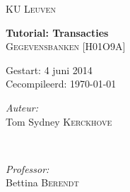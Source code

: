 \begin{titlepage}
\thispagestyle{empty}
\newcommand{\HRule}{\rule{\linewidth}{0.5mm}}
\center
\textsc{\LARGE KU Leuven}\\[1.5cm]
\vfill


{ \Huge \bfseries Tutorial: Transacties}\\[0.4cm]
\textsc{\large Gegevensbanken [H01O9A]}\\[0.5cm]

\vspace{5cm}

\begin{Large}
Gestart: 4 juni 2014\\
Cecompileerd: \today\\
\end{Large}
\vspace{5cm}

\begin{minipage}{0.4\textwidth}
\begin{flushleft} \large
\emph{Auteur:}\\
Tom Sydney \textsc{Kerckhove}
\end{flushleft}
\end{minipage}
~
\begin{minipage}{0.4\textwidth}
\begin{flushright} \large
\emph{Professor:} \\
Bettina \textsc{Berendt}\\
\end{flushright}
\end{minipage}\\[4cm]

\vfill

\end{titlepage}